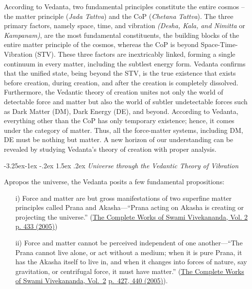 \documentclass[twoside, 13pt]{article}
\makeatletter
\renewcommand\subsection{\@startsection{subsection}{2}{\z@}%
                                     {-3.25ex\@plus -1ex \@minus -.2ex}%
                                     {1.5ex \@plus .2ex}%
                                     {\normalfont\Large\bfseries}}
\makeatother
\begin{document}
{{\fontsize{12}{14}\selectfont According to Vedanta, two fundamental principles constitute the entire cosmos – the matter principle (\textit{Jada Tattva}) and the CoP (\textit{Chetana Tattva}). The three primary factors, namely space, time, and vibration \textit{(Desha, Kala, and Nimitta} or \textit{Kampanam)}, are the most fundamental constituents, the building blocks of the entire matter principle of the cosmos, whereas the CoP is beyond Space-Time-Vibration (STV). These three factors are inextricably linked, forming a single continuum in every matter, including the subtlest energy form. Vedanta confirms that the unified state, being beyond the STV, is the true existence that exists before creation, during creation, and after the creation is completely dissolved. Furthermore, the Vedantic theory of creation unites not only the world of detectable force and matter but also the world of subtler undetectable forces such as Dark Matter (DM), Dark Energy (DE), and beyond. According to Vedanta, everything other than the CoP has only temporary existence; hence, it comes under the category of matter. Thus, all the force-matter systems, including DM, DE must be nothing but matter. A new horizon of our understanding can be revealed by studying Vedanta’s theory of creation with proper analysis.}

{\fontsize{8}{10}\selectfont\subsection{\textit{Universe through the Vedantic Theory of Vibration}}}\label{subsec-2.1}

{\fontsize{12}{14}\selectfont Apropos the universe, the Vedanta posits a few fundamental propositions:

\begin{itemize}

\item[i)] Force and matter are but gross manifestations of two superfine matter principles called Prana and Akasha—“Prana acting on Akasha is creating or projecting the universe.” (\underline{The Complete Works of Swami Vivekananda, Vol. 2 p. 433 (2005)})

\newpage

\item[ii)] Force and matter cannot be perceived independent of one another—“The Prana cannot live alone, or act without a medium; when it is pure Prana, it has the Akasha itself to live in, and when it changes into forces of nature, say gravitation, or centrifugal force, it must have matter.” (\underline{The Complete Works of Swami Vivekananda, Vol.~2} \underline{p.~427, 440 (2005)}).


\end{itemize}}}
\end{document}
